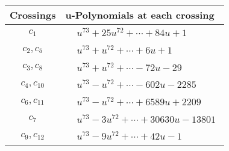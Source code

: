\documentclass[1p]{elsarticle_modified}
\theoremstyle{definition}
\begin{document}
\begin{tabular}{m{50pt}|m{274pt}}
Crossings & \hspace{64pt}u-Polynomials at each crossing \\
\hline $$\begin{aligned}c_{1}\end{aligned}$$&$\begin{aligned}
&u^{73}+25 u^{72}+\cdots+84 u+1
\end{aligned}$\\
\hline $$\begin{aligned}c_{2},c_{5}\end{aligned}$$&$\begin{aligned}
&u^{73}+u^{72}+\cdots+6 u+1
\end{aligned}$\\
\hline $$\begin{aligned}c_{3},c_{8}\end{aligned}$$&$\begin{aligned}
&u^{73}+u^{72}+\cdots-72 u-29
\end{aligned}$\\
\hline $$\begin{aligned}c_{4},c_{10}\end{aligned}$$&$\begin{aligned}
&u^{73}- u^{72}+\cdots-602 u-2285
\end{aligned}$\\
\hline $$\begin{aligned}c_{6},c_{11}\end{aligned}$$&$\begin{aligned}
&u^{73}- u^{72}+\cdots+6589 u+2209
\end{aligned}$\\
\hline $$\begin{aligned}c_{7}\end{aligned}$$&$\begin{aligned}
&u^{73}-3 u^{72}+\cdots+30630 u-13801
\end{aligned}$\\
\hline $$\begin{aligned}c_{9},c_{12}\end{aligned}$$&$\begin{aligned}
&u^{73}-9 u^{72}+\cdots+42 u-1
\end{aligned}$\\
\hline
\end{tabular}\\~\\
\newpage\renewcommand{\arraystretch}{1}
\end{document}
